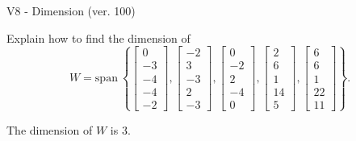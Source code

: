 \begin{exercise}
  \begin{exerciseTitle}V8 - Dimension (ver. 100)\end{exerciseTitle}
  \begin{exerciseStatement}
    Explain how to find the dimension of 
\[W=\mathrm{span}\ \left\{\left[\begin{array}{r}
0 \\
-3 \\
-4 \\
-4 \\
-2
\end{array}\right] , \left[\begin{array}{r}
-2 \\
3 \\
-3 \\
2 \\
-3
\end{array}\right] , \left[\begin{array}{r}
0 \\
-2 \\
2 \\
-4 \\
0
\end{array}\right] , \left[\begin{array}{r}
2 \\
6 \\
1 \\
14 \\
5
\end{array}\right] , \left[\begin{array}{r}
6 \\
6 \\
1 \\
22 \\
11
\end{array}\right]\right\}.\]



  \end{exerciseStatement}
  \begin{exerciseAnswer}
   The dimension of \(W\) is  \(3\).
  


  \end{exerciseAnswer}
\end{exercise}